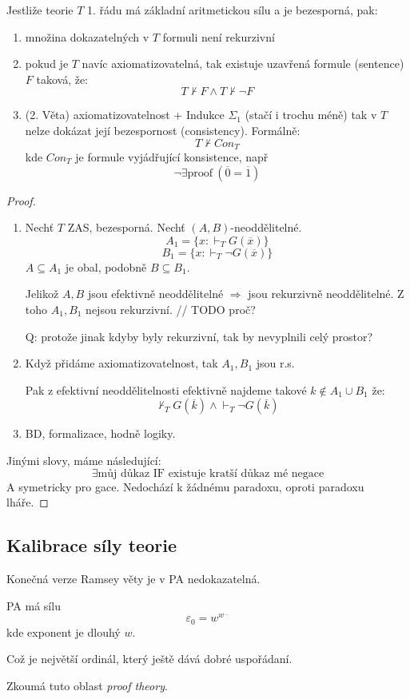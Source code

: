\begin{theorem}\label{godel}
	Jestliže teorie $T$ 1. řádu má základní aritmetickou sílu a je bezesporná, pak:
	\begin{enumerate}
		\item množina dokazatelných v $T$ formuli není rekurzivní
		\item pokud je $T$ navíc axiomatizovatelná, tak existuje uzavřená formule (sentence) $F$ taková, že:
			\[ T \nvdash F \land T \nvdash \neg F \]
		\item (2. Věta) axiomatizovatelnost + Indukce $\Sigma_1$ (stačí i trochu méně) tak v $T$ nelze dokázat její bezespornost (consistency).
		Formálně:
		\[ T \nvdash Con_T \]
		kde $Con_T$ je formule vyjádřující konsistence, např
		\[ \neg \exists \text{proof}\ (\overline{0} = \overline{1}) \]
	\end{enumerate}
\end{theorem}
\begin{proof}
	\begin{enumerate}
		\item Nechť $T$ ZAS, bezesporná. Nechť $(A, B)$-neoddělitelné.
			\[ A_1 = \{ x: \vdash_T G(\overline{x}) \} \]
			\[ B_1 = \{ x: \vdash_T \neg G(\overline{x}) \} \]
			$A \subseteq A_1$ je obal, podobně $B \subseteq B_1$.

			Jelikož $A, B$ jsou efektivně neoddělitelné $\Rightarrow$ jsou rekurzivně neoddělitelné.
			Z toho $A_1, B_1$ nejsou rekurzivní. // TODO proč?

			Q: protože jinak kdyby byly rekurzivní, tak by nevyplnili celý prostor?
		\item Když přidáme axiomatizovatelnost, tak $A_1, B_1$  jsou r.s.

			Pak z efektivní neoddělitelnosti efektivně najdeme takové $k \notin A_1 \cup B_1$ že:
			\[ \nvdash_T G(\overline{k}) \land \vdash_T \neg G(\overline{k}) \]
		\item BD, formalizace, hodně logiky.
	\end{enumerate}

	Jinými slovy, máme následující:
	\[ \exists \text{můj důkaz IF existuje kratší důkaz mé negace} \]
	A symetricky pro gace. Nedochází k žádnému paradoxu, oproti paradoxu lháře.
\end{proof}

\subsection{Kalibrace síly teorie}

\begin{note}
	Konečná verze Ramsey věty je v PA nedokazatelná.
\end{note}

\begin{note}
	PA má sílu
	\[ \varepsilon_0 = w^{w^{\ldots}} \]
	kde exponent je dlouhý $w$.

	Což je největší ordinál, který ještě dává dobré uspořádaní.

	Zkoumá tuto oblast \emph{proof theory}.
\end{note}
